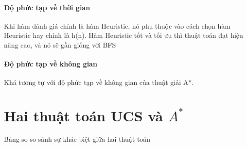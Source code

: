 \documentclass{article}
\begin{document}
\paragraph{Độ phức tạp về thời gian}
Khi hàm đánh giá chính là hàm Heuristic, nó phụ thuộc vào cách chọn hàm Heuristic hay chính là h(n). Hàm Heuristic tốt và tối ưu thì thuật toán đạt hiệu năng cao, và nó sẽ gần giống với BFS
\paragraph{Độ phức tạp về không gian}
Khá tương tự với độ phức tạp về không gian của thuật giải A*.
\newpage

\section{Hai thuật toán UCS và $A^{*}$}
Bảng so so sánh sự khác biệt giữa hai thuật toán
\end{document}

